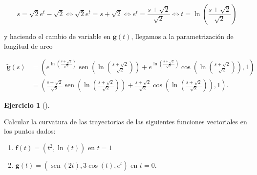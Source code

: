 \documentclass[
  spanish,
  a4paper,
]{scrreport}
\theoremstyle{definition}
\newtheorem{exercise}{Ejercicio}[chapter]
\theoremstyle{remark}
\begin{document}
\begin{tcolorbox}
\begin{enumerate}
  \[
  s = \sqrt{2}e^t-\sqrt{2}
  \Leftrightarrow \sqrt{2}e^t = s+\sqrt{2}
  \Leftrightarrow e^t = \frac{s+\sqrt{2}}{\sqrt{2}}
  \Leftrightarrow t = \ln\left(\frac{s+\sqrt{2}}{\sqrt{2}}\right)
  \]

  y haciendo el cambio de variable en \(\mathbf{g}(t)\), llegamos a la
  parametrización de longitud de arco

  \begin{align*}
  \tilde{\mathbf{g}}(s) 
  &= \left(e^{\ln\left(\frac{s+\sqrt{2}}{\sqrt{2}}\right)}\operatorname{sen}\left(\ln\left(\frac{s+\sqrt{2}}{\sqrt{2}}\right)\right) + e^{\ln\left(\frac{s+\sqrt{2}}{\sqrt{2}}\right)}\cos\left(\ln\left(\frac{s+\sqrt{2}}{\sqrt{2}}\right)\right), 1 \right) \\
  &= \left(\frac{s+\sqrt{2}}{\sqrt{2}}\operatorname{sen}\left(\ln\left(\frac{s+\sqrt{2}}{\sqrt{2}}\right)\right) + \frac{s+\sqrt{2}}{\sqrt{2}}\cos\left(\ln\left(\frac{s+\sqrt{2}}{\sqrt{2}}\right)\right), 1 \right).
  \end{align*}
\end{enumerate}

\end{tcolorbox}

\begin{exercise}[]\protect\hypertarget{exr-curvatura-1}{}\label{exr-curvatura-1}

Calcular la curvatura de las trayectorias de las siguientes funciones
vectoriales en los puntos dados:

\begin{enumerate}
\def\labelenumi{\alph{enumi}.}
\item
  \(\mathbf{f}(t) = (t^2, \ln(t))\) en \(t=1\)
\item
  \(\mathbf{g}(t) = (\operatorname{sen}(2t), 3\cos(t), e^t)\) en
  \(t=0\).
\end{enumerate}

\end{exercise}
\end{document}
